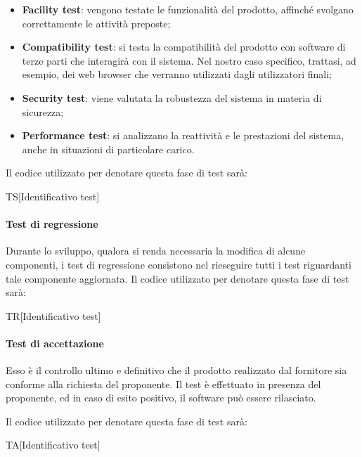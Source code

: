 		\begin{itemize}
			\item \textbf{Facility test}: vengono testate le funzionalità del prodotto, affinché svolgano correttamente le attività preposte;
			\item \textbf{Compatibility test}: si testa la compatibilità del prodotto con software di terze parti che interagirà con il sistema. Nel nostro caso specifico, trattasi, ad esempio, dei web browser che verranno utilizzati dagli utilizzatori finali;
			\item \textbf{Security test}: viene valutata la robustezza del sistema in materia di sicurezza;
			\item \textbf{Performance test}: si analizzano la reattività e le prestazioni del sistema, anche in situazioni di particolare carico.
		\end{itemize}
	
		Il codice utilizzato per denotare questa fase di test sarà:
		
		\begin{center}
			TS[Identificativo test]
		\end{center}
	
		\paragraph{Test di regressione}
		Durante lo sviluppo, qualora si renda necessaria la modifica di alcune componenti, i test di regressione consistono nel rieseguire tutti i test riguardanti tale componente aggiornata. Il codice utilizzato per denotare questa fase di test sarà:
		
		\begin{center}
			TR[Identificativo test]
		\end{center}
	
		\paragraph{Test di accettazione}
		Esso è il controllo ultimo e definitivo che il prodotto realizzato dal fornitore sia conforme alla richiesta del proponente. Il test è effettuato in presenza del proponente, ed in caso di esito positivo, il software può essere rilasciato.
		
		Il codice utilizzato per denotare questa fase di test sarà:
		
		\begin{center}
			TA[Identificativo test]
		\end{center}
	
